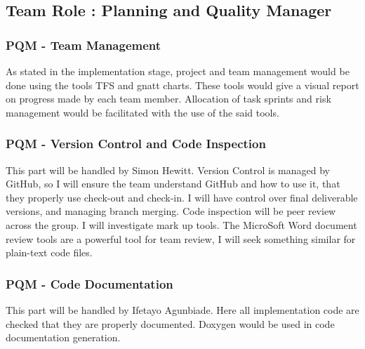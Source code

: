 \documentclass{article}
\begin{document}
\newpage
\subsection{Team Role : Planning and Quality Manager}

\subsubsection{PQM - Team Management}
As stated in the implementation stage, project and team management would be done using the tools TFS and gnatt charts. These tools would give a visual report on progress made by each team member. Allocation of task sprints and risk management would be facilitated with the use of the said tools.
\subsubsection{PQM - Version Control and Code Inspection}
This part will be handled by Simon Hewitt. Version Control is managed by GitHub, so I will ensure the team understand GitHub and how to use it, that they properly use check-out and check-in. I will have control over final deliverable versions, and managing branch merging.
Code inspection will be peer review across the group. I will investigate mark up tools. The MicroSoft Word document review tools are a powerful tool for team review, I will seek something similar for plain-text code files. 
\subsubsection{PQM - Code Documentation}
This part will be handled by Ifetayo Agunbiade. Here all implementation code are checked that they are properly documented. Doxygen would be used in code documentation generation.
\end{document}
